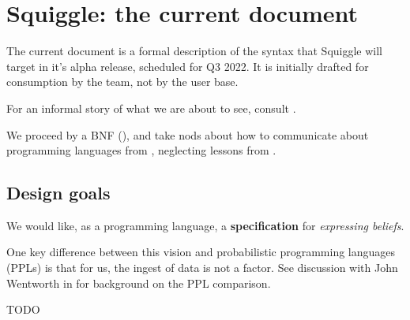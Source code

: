 \documentclass[../main.tex]{subfiles}
\begin{document}
\section{Squiggle: the current document}

The current document is a formal description of the syntax that Squiggle will target in it's alpha release, scheduled for Q3 2022. It is initially drafted for consumption by the team, not by the user base.

For an informal story of what we are about to see, consult \cite{@SqgCodePlan}.

We proceed by a BNF (\cite{@BNFWiki}), and take nods about how to communicate about programming languages from \cite{@CraftingInterpreters}, neglecting lessons from \cite{@PFPL}.

\subsection{Design goals}

We would like, as a programming language, a \textbf{specification} for \textit{expressing beliefs}.

One key difference between this vision and probabilistic programming languages (PPLs) is that for us, the ingest of data is not a factor. See discussion with John Wentworth in \cite{@SqgSequence} for background on the PPL comparison.

TODO
\end{document}
